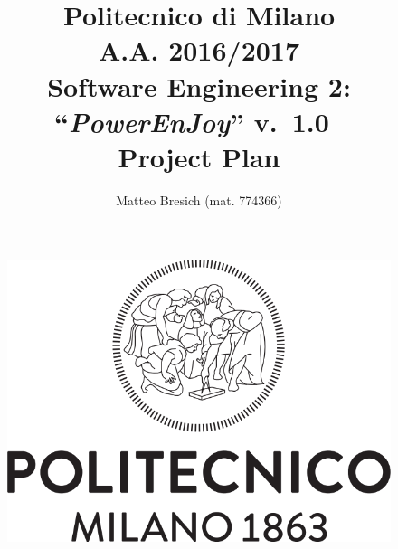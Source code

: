 \documentclass{article}
\newcommand{\version}{\mbox{\normalfont v. 1.0 }}
\begin{document}
	\title{Politecnico di Milano\\A.A. 2016/2017\\Software Engineering 2: ``{\em PowerEnJoy}'' \version \\ \bigskip \textbf{P}roject \textbf{P}lan }
	\author{Matteo Bresich (mat. 774366)}
	
	
	
	\begin{figure}[t]
		\centering
		\includegraphics[width=\linewidth]{"img/logo-polimi"}
		\label{fig:polimi-logo}
	\end{figure}

	\maketitle
	
	\thispagestyle{empty}
	\clearpage\mbox{}\thispagestyle{empty}\clearpage
	
	\renewcommand*\thesection{\arabic{section}}
	\renewcommand*\thesubsection{\arabic{section}.\arabic{subsection}}
	\renewcommand*\thesubsubsection{%
		\arabic{section}.\arabic{subsection}.\arabic{subsubsection}%
	}
	\setcounter{secnumdepth}{4}
	\setcounter{tocdepth}{4}
	
	\renewcommand{\contentsname}{Table of Content}
	\tableofcontents
	
\end{document}
